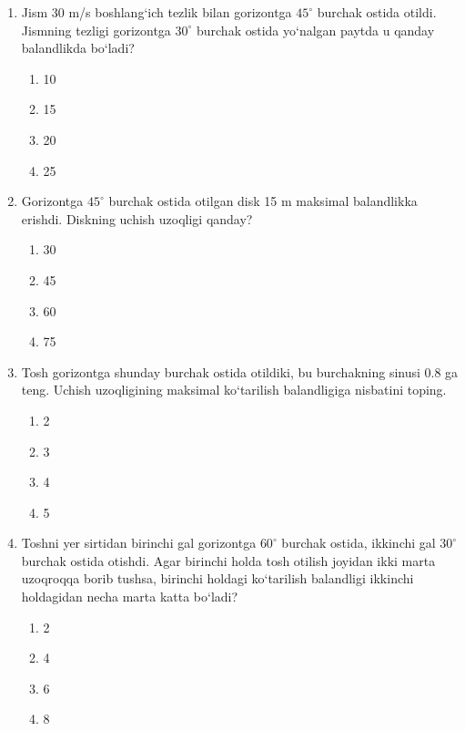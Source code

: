 \begin{enumerate}
\begin{enumerate}[label=\Alph*)]
\item 40
\item 60
\item 80
\item 100
\end{enumerate}

\item Jism 30 m/s boshlang‘ich tezlik bilan gorizontga $45^\circ$ burchak ostida otildi. Jismning tezligi gorizontga $30^\circ$ burchak ostida yo‘nalgan paytda u qanday balandlikda bo‘ladi?

\begin{enumerate}[label=\Alph*)]
\item 10
\item 15
\item 20
\item 25
\end{enumerate}

\item Gorizontga $45^\circ$ burchak ostida otilgan disk 15 m maksimal balandlikka erishdi. Diskning uchish uzoqligi qanday?

\begin{enumerate}[label=\Alph*)]
\item 30
\item 45
\item 60
\item 75
\end{enumerate}

\item Tosh gorizontga shunday burchak ostida otildiki, bu burchakning sinusi 0.8 ga teng. Uchish uzoqligining maksimal ko‘tarilish balandligiga nisbatini toping.

\begin{enumerate}[label=\Alph*)]
\item 2
\item 3
\item 4
\item 5
\end{enumerate}

\item Toshni yer sirtidan birinchi gal gorizontga $60^\circ$ burchak ostida, ikkinchi gal $30^\circ$ burchak ostida otishdi. Agar birinchi holda tosh otilish joyidan ikki marta uzoqroqqa borib tushsa, birinchi holdagi ko‘tarilish balandligi ikkinchi holdagidan necha marta katta bo‘ladi?

\begin{enumerate}[label=\Alph*)]
\item 2
\item 4
\item 6
\item 8
\end{enumerate}


\end{enumerate}
